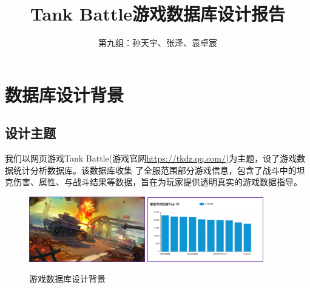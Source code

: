 \documentclass[UTF8, a4paper]{ctexart}
\title{Tank Battle游戏数据库设计报告}
\author{第九组：孙天宇、张泽、袁卓宸}
\begin{document}
\maketitle
\tableofcontents
\newpage
\section{数据库设计背景}
\subsection{设计主题}
我们以网页游戏Tank Battle(游戏官网\href{https://tkdz.qq.com/}{https://tkdz.qq.com/})为主题，设了游戏数据统计分析数据库。该数据库收集
了全服范围部分游戏信息，包含了战斗中的坦克伤害、属性、与战斗结果等数据，旨在为玩家提供透明真实的游戏数据指导。

  \begin{figure}[h]
    \centering
        {\includegraphics[width=0.45\textwidth]{game.png}}
    \hspace{0.05\textwidth}
        {\includegraphics[width=0.45\textwidth]{statistics.png}}
    \caption{游戏数据库设计背景}
    \label{fig:chap3:resultPWF}
  \end{figure}
\end{document}
